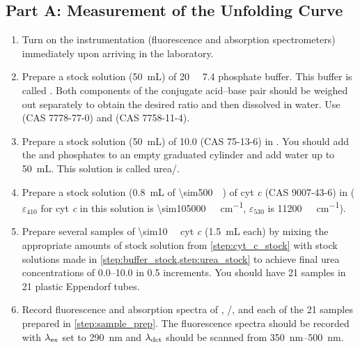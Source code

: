 \documentclass[nobib,nofonts,nols,nohyper]{tufte-handout}
\begin{document}
\subsection{Part A: Measurement of the Unfolding Curve} %
\label{sub:part_a_measurement_of_the_unfolding_curve}

\begin{enumerate}
  \item Turn on the instrumentation (fluorescence and absorption spectrometers) immediately upon arriving in the laboratory. 
  \item Prepare a stock solution (\SI{50}{\mL}) of \SI{20}{\milli\Molar} \pH{} \num{7.4} phosphate buffer. 
  This buffer is called . 
  Both components of the conjugate acid--base pair should be weighed out separately to obtain the desired ratio and then dissolved in water. 
  Use  (CAS 7778-77-0) and  (CAS 7758-11-4).
  \label{step:buffer_stock}
  \item Prepare a stock solution (\SI{50}{\mL}) of \SI{10.0}{\Molar}  (CAS 75-13-6) in . 
  You should add the  and phosphates to an empty graduated cylinder and add water up to \SI{50}{\mL}. 
  This solution is called urea/. 
  \label{step:urea_stock}
  \item Prepare a stock solution (\SI{0.8}{\mL} of \SI{\sim500}{\milli\Molar}) of cyt \emph{c} (CAS 9007-43-6) in  (\( \varepsilon_{410} \) for cyt \emph{c} in this solution is \SI{\sim105000}{\per\Molar\per\cm}, \( \varepsilon_{530} \) is \SI{11200}{\per\Molar\per\cm}).
  \label{step:cyt_c_stock}
  \item Prepare several samples of \SI{\sim10}{\micro\Molar} cyt \emph{c} (\SI{1.5}{\mL} each) by mixing the appropriate amounts of stock solution from \cref{step:cyt_c_stock} with stock solutions made in \cref{step:buffer_stock,step:urea_stock} to achieve final urea concentrations of \SIrange{0.0}{10.0}{\Molar} in \SI{0.5}{\Molar} increments. 
  You should have \num{21} samples in \num{21} plastic Eppendorf tubes.
  \label{step:sample_prep}
  \item Record fluorescence and absorption spectra of , /, and each of the \num{21} samples prepared in \cref{step:sample_prep}. 
  The fluorescence spectra should be recorded with \( \lambda_{\textnormal{ex}} \) set to \SI{290}{\nm} and \( \lambda_{\textnormal{det}} \) should be scanned from \SIrange{350}{500}{\nm}. 

\end{enumerate}
\end{document}
